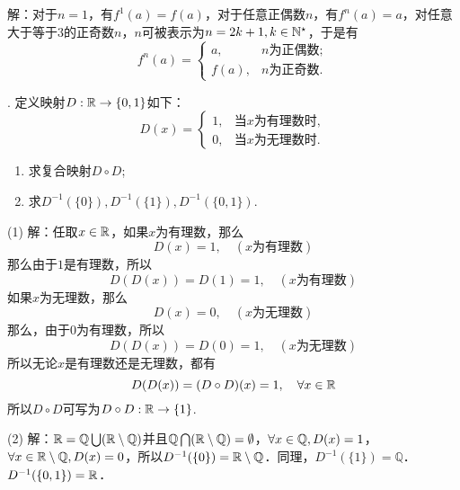 \noindent 解：对于$n=1$，有$f^1 (a) = f(a)$，对于任意正偶数$n$，有$f^n (a) = a$，对任意大于等于$3$的正奇数$n$，$n$可被表示为$n=2k+1, k \in \mathbb{N}^\star$，于是有
\begin{equation}
    f^{n}(a) = \begin{cases}
        a, & n\text{为正偶数}; \\
        f(a), & n\text{为正奇数}.
    \end{cases}
\end{equation}

. 定义映射$D: \mathbb{R} \to \{ 0, 1 \}$如下：
\begin{equation}
    D(x) = \begin{cases}
        1, & \text{当}x\text{为有理数时}, \\
        0, & \text{当}x\text{为无理数时}.
    \end{cases}
\end{equation}
\begin{enumerate}
    \item 求复合映射$D \circ D$;
    \item 求$D^{-1}(\{0\}), D^{-1}(\{1\}), D^{-1}(\{0,1\})$.
\end{enumerate}

\noindent (1) 解：任取$x \in \mathbb{R}$，如果$x$为有理数，那么
\begin{equation}
    D(x) = 1, \quad (x\text{为有理数})
\end{equation}
那么由于$1$是有理数，所以
\begin{equation}
    D(D(x)) = D(1) = 1, \quad (x\text{为有理数})
\end{equation}
如果$x$为无理数，那么
\begin{equation}
    D(x) = 0, \quad (x\text{为无理数})
\end{equation}
那么，由于$0$为有理数，所以
\begin{equation}
    D(D(x)) = D(0) = 1, \quad (x\text{为无理数})
\end{equation}
所以无论$x$是有理数还是无理数，都有
\begin{equation}
    D(D(x)) = (D \circ D)(x) = 1, \quad \forall x \in \mathbb{R}
\end{equation}
所以$D \circ D$可写为$D \circ D: \mathbb{R} \to \{ 1 \}$.

\noindent (2) 解：$\mathbb{R} = \mathbb{Q} \bigcup (\mathbb{R} \setminus \mathbb{Q})$并且$\mathbb{Q} \bigcap (\mathbb{R} \setminus \mathbb{Q}) = \emptyset$，$\forall x \in \mathbb{Q}, D(x) = 1$，$\forall x \in \mathbb{R} \setminus \mathbb{Q}, D(x) = 0$，所以$D^{-1}(\{0\}) = \mathbb{R\setminus Q}$．同理，$D^{-1}(\{1\}) = \mathbb{Q}$．$D^{-1}(\{0, 1\}) = \mathbb{R}$．

